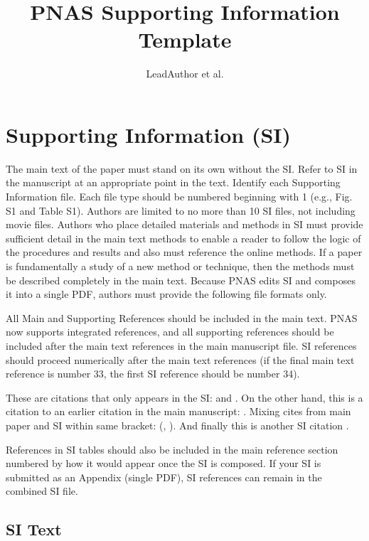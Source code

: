 \documentclass[9pt,twocolumn,twoside]{pnas-new}
\title{PNAS Supporting Information Template}
\author{LeadAuthor et al.}
\begin{document}
\maketitle

\section*{Supporting Information (SI)}

The main text of the paper must stand on its own without the SI. Refer to SI in the manuscript at an appropriate point in the text. Identify each Supporting Information file. Each file type should be numbered beginning with 1 (e.g., Fig. S1 and Table S1). Authors are limited to no more than 10 SI files, not including movie files. Authors who place detailed materials and methods in SI must provide sufficient detail in the main text methods to enable a reader to follow the logic of the procedures and results and also must reference the online methods. If a paper is fundamentally a study of a new method or technique, then the methods must be described completely in the main text. Because PNAS edits SI and composes it into a single PDF, authors must provide the following file formats only.

All Main and Supporting References should be included in the main text. PNAS now supports integrated references, and all supporting references should be included after the main text references in the main manuscript file. SI references should proceed numerically after the main text references (if the final main text reference is number 33, the first SI reference should be number 34). 

These are citations that only appears in the SI: \cite{varga2016multilingual} and \cite{olsen1992optimal}.
On the other hand, this is a citation to an earlier citation in the main manuscript: . 
Mixing cites from main paper and SI within same bracket: (, ). And finally this is another SI citation \cite{baklouti2015towards}.

References in SI tables should also be included in the main reference section numbered by how it would appear once the SI is composed. If your SI is submitted as an Appendix (single PDF), SI references can remain in the combined SI file. 
\subsection*{SI Text}
\end{document}
